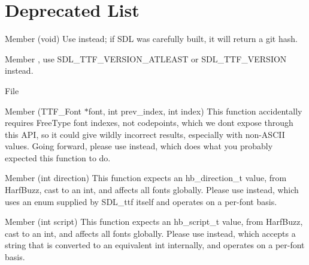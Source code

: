 \chapter{Deprecated List}
\hypertarget{deprecated}{}\label{deprecated}

\begin{DoxyRefList}
\item[Member \doxylink{_s_d_l__version_8h_a3aaf4a973a60915fd9a30de51b17c3e4}{SDL\+\_\+\+Get\+Revision\+Number} (void)]\label{deprecated__deprecated000002}%
%
Use  instead; if SDL was carefully built, it will return a git hash. 
\item[Member \doxylink{_s_d_l__ttf_8h_a2ba3940255fc228728d9eb0c5a815aad}{SDL\+\_\+\+TTF\+\_\+\+COMPILEDVERSION} ]\label{deprecated__deprecated000003}%
%
, use SDL\+\_\+\+TTF\+\_\+\+VERSION\+\_\+\+ATLEAST or SDL\+\_\+\+TTF\+\_\+\+VERSION instead.  
\item[File \doxylink{_s_d_l__types_8h}{SDL\+\_\+types.h} ]\label{deprecated__deprecated000001}%
%
  
\item[Member \doxylink{_s_d_l__ttf_8h_afa971c6ffc92e8d5e2a08cc396549756}{TTF\+\_\+\+Get\+Font\+Kerning\+Size} (TTF\+\_\+\+Font \texorpdfstring{$\ast$}{*}font, int prev\+\_\+index, int index)]\label{deprecated__deprecated000004}%
%
This function accidentally requires Free\+Type font indexes, not codepoints, which we don\textquotesingle{}t expose through this API, so it could give wildly incorrect results, especially with non-\/\+ASCII values. Going forward, please use  instead, which does what you probably expected this function to do. 
\item[Member \doxylink{_s_d_l__ttf_8h_a56c4ce011601169540e6771a037f126a}{TTF\+\_\+\+Set\+Direction} (int direction)]\label{deprecated__deprecated000005}%
%
This function expects an hb\+\_\+direction\+\_\+t value, from Harf\+Buzz, cast to an int, and affects all fonts globally. Please use  instead, which uses an enum supplied by SDL\+\_\+ttf itself and operates on a per-\/font basis. 
\item[Member \doxylink{_s_d_l__ttf_8h_a6ed08cb4253538af931e5e97505a856d}{TTF\+\_\+\+Set\+Script} (int script)]\label{deprecated__deprecated000006}%
%
This function expects an hb\+\_\+script\+\_\+t value, from Harf\+Buzz, cast to an int, and affects all fonts globally. Please use  instead, which accepts a string that is converted to an equivalent int internally, and operates on a per-\/font basis.
\end{DoxyRefList}